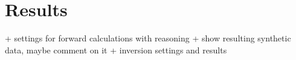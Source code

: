 \section{Results}\label{section:Results}
+ settings for forward calculations with reasoning
+ show resulting synthetic data, maybe comment on it
+ inversion settings and results



